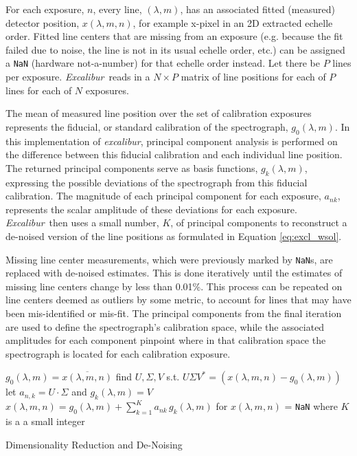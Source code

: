 \documentclass[modern]{aastex63}
\newcommand{\project}[1]{\textsl{#1}}
\newcommand{\name}{\project{excalibur}}
\newcommand{\Name}{\project{Excalibur}}
\newcommand{\code}[1]{\texttt{#1}}
\begin{document}
For each exposure, $n$, every line, $(\lambda,m)$, has an associated fitted (measured) detector position, $x(\lambda,m,n)$, for example x-pixel in an 2D extracted echelle order.  Fitted line centers that are missing from an exposure (e.g. because the fit failed due to noise, the line is not in its usual echelle order, etc.) can be assigned a \code{NaN} (hardware not-a-number) for that echelle order instead.  Let there be $P$ lines per exposure.  \Name\ reads in a $N \times P$ matrix of line positions for each of $P$ lines for each of $N$ exposures.

The mean of measured line position over the set of calibration exposures represents the fiducial, or standard calibration of the spectrograph, $g_0(\lambda,m)$.  In this implementation of \name, principal component analysis is performed on the difference between this fiducial calibration and each individual line position.  The returned principal components serve as basis functions,  $g_k(\lambda,m)$, expressing the possible deviations of the spectrograph from this fiducial calibration.  The magnitude of each principal component for each exposure, $a_{nk}$, represents the scalar amplitude of these deviations for each exposure.  \Name\ then uses a small number, $K$, of principal components to reconstruct a de-noised version of the line positions as formulated in Equation \ref{eq:excl_wsol}.

Missing line center measurements, which were previously marked by \code{NaN}s, are replaced with de-noised estimates.  This is done iteratively until the estimates of missing line centers change by less than 0.01\%.  This process can be repeated on line centers deemed as outliers by some metric, to account for lines that may have been mis-identified or mis-fit.  The principal components from the final iteration are used to define the spectrograph's calibration space, while the associated amplitudes for each component pinpoint where in that calibration space the spectrograph is located for each calibration exposure.

\begin{algorithm}
\SetAlgoLined
{}
{
	$g_0(\lambda,m) = \overline{x(\lambda,m,n)}$\;
	find $U, \Sigma, V$ s.t. $U\Sigma V^* = (x(\lambda,m,n)-g_0(\lambda,m))$\;
	let $a_{n,k} = U\cdot \Sigma$ and $g_k(\lambda,m) = V$\;
	$x(\lambda,m,n) = g_0(\lambda,m) + \sum_{k=1}^K a_{nk}\,g_k(\lambda,m)$ for $x(\lambda,m,n)$ = \code{NaN} where $K$ is a a small integer
	}
\caption{Dimensionality Reduction and De-Noising}
\end{algorithm}
\end{document}
